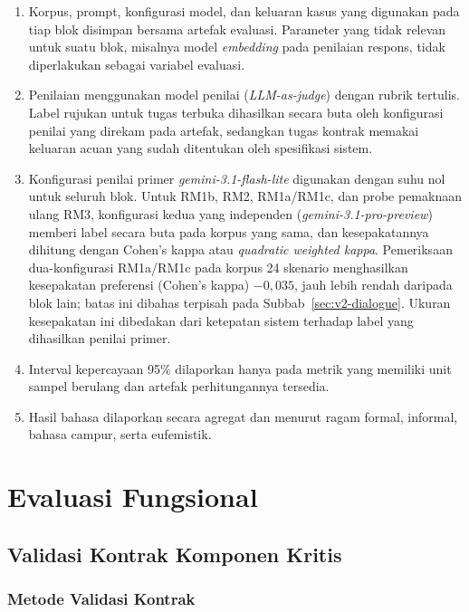 \begin{enumerate}[label=\arabic*.,leftmargin=*,itemsep=3pt]
  \item Korpus, prompt, konfigurasi model, dan keluaran kasus yang digunakan pada tiap blok disimpan bersama artefak evaluasi. Parameter yang tidak relevan untuk suatu blok, misalnya model \textit{embedding} pada penilaian respons, tidak diperlakukan sebagai variabel evaluasi.
  \item Penilaian menggunakan model penilai (\textit{LLM-as-judge}) dengan rubrik tertulis. Label rujukan untuk tugas terbuka dihasilkan secara buta oleh konfigurasi penilai yang direkam pada artefak, sedangkan tugas kontrak memakai keluaran acuan yang sudah ditentukan oleh spesifikasi sistem.
  \item Konfigurasi penilai primer \textit{gemini-3.1-flash-lite} digunakan dengan suhu nol untuk seluruh blok. Untuk RM1b, RM2, RM1a/RM1c, dan probe pemaknaan ulang RM3, konfigurasi kedua yang independen (\textit{gemini-3.1-pro-preview}) memberi label secara buta pada korpus yang sama, dan kesepakatannya dihitung dengan Cohen's kappa atau \textit{quadratic weighted kappa}. Pemeriksaan dua-konfigurasi RM1a/RM1c pada korpus 24 skenario menghasilkan kesepakatan preferensi (Cohen's kappa) $-0,035$, jauh lebih rendah daripada blok lain; batas ini dibahas terpisah pada Subbab~\ref{sec:v2-dialogue}. Ukuran kesepakatan ini dibedakan dari ketepatan sistem terhadap label yang dihasilkan penilai primer.
  \item Interval kepercayaan 95\% dilaporkan hanya pada metrik yang memiliki unit sampel berulang dan artefak perhitungannya tersedia.
  \item Hasil bahasa dilaporkan secara agregat dan menurut ragam formal, informal, bahasa campur, serta eufemistik.
\end{enumerate}

\section{Evaluasi Fungsional}
\label{sec:evaluasi-fungsional}

\subsection{Validasi Kontrak Komponen Kritis}

\subsubsection{Metode Validasi Kontrak}

